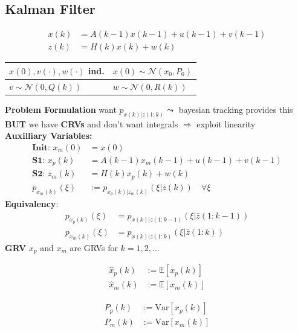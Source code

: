 \subsection{Kalman Filter}

\begin{align*}
    x(k) &= A(k-1)x(k-1)+u(k-1)+v(k-1)\\
    z(k) &= H(k)x(k)+w(k)
\end{align*}
\vspace{-1.8em}
\begin{center}
    \begin{tabular}{|l|l|}
        \hline
        $x(0), v(\cdot), w(\cdot)$ ind. & $x(0) \sim \mathcal{N}(x_0, P_0)$\\
        \hline
        $v \sim \mathcal{N}(0, Q(k))$ & $w \sim \mathcal{N}(0, R(k))$\\
        \hline
    \end{tabular} 
\end{center}
\vspace{-0.8em}

\textbf{Problem Formulation} want $p_{x(k)|z(1:k)} \leadsto$ bayesian tracking provides this
\textbf{BUT} we have \textbf{CRVs} and don't want integrals $\Rightarrow$ exploit linearity\\
\textbf{Auxilliary Variables:}
\begin{align*}
        \textbf{Init: } x_m(0) &= x(0) \\
        \textbf{S1: } x_p(k) &= A(k-1)x_m(k-1) + u(k-1) + v(k-1) \\
        \textbf{S2: } z_m(k) &= H(k) x_p(k) + w(k) \\
        p_{x_m(k)}(\xi) &:= p_{x_p(k)|z_m(k)}(\xi | \bar{z}(k)) \quad \forall\xi
\end{align*}
\textbf{Equivalency}:
\begin{align*}
    p_{x_p(k)}(\xi) &= p_{x(k)|z(1:k-1)}(\xi|\bar{z}(1:k-1)) \\
    p_{x_m(k)}(\xi) &= p_{x(k)|z(1:k)}(\xi|\bar{z}(1:k))
\end{align*}
\textbf{GRV} $x_p$ and $x_m$ are GRVs for $k=1,2,\dots$\\
\begin{minipage}[c]{0.45\linewidth}
    \begin{align*}
        \widehat{x}_p(k) &:= \mathbb{E}\left[ x_p(k) \right] \\
        \widehat{x}_m(k) &:= \mathbb{E}\left[ x_m(k) \right]
    \end{align*}
\end{minipage}
\begin{minipage}[c]{0.45\linewidth}
    \begin{align*}
        P_p(k) &:= \mathrm{Var}\left[ x_p(k) \right] \\
        P_m(k) &:= \mathrm{Var}\left[ x_m(k) \right]
    \end{align*}
\end{minipage}

